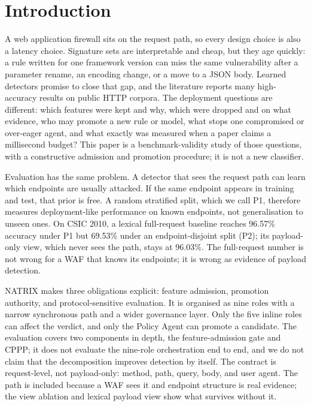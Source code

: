 \documentclass[preprint,11pt]{elsarticle}
\begin{document}
\section{Introduction}\label{introduction}

A web application firewall sits on the request path, so every design
choice is also a latency choice. Signature sets are interpretable and
cheap, but they age quickly: a rule written for one framework version
can miss the same vulnerability after a parameter rename, an encoding
change, or a move to a JSON body. Learned detectors promise to close
that gap, and the literature reports many high-accuracy results on
public HTTP corpora. The deployment questions are different: which
features were kept and why, which were dropped and on what evidence, who
may promote a new rule or model, what stops one compromised or
over-eager agent, and what exactly was measured when a paper claims a
millisecond budget? This paper is a benchmark-validity study of those
questions, with a constructive admission and promotion procedure; it is
not a new classifier.

Evaluation has the same problem. A detector that sees the request path
can learn which endpoints are usually attacked. If the same endpoint
appears in training and test, that prior is free. A random stratified
split, which we call P1, therefore measures deployment-like performance
on known endpoints, not generalisation to unseen ones. On CSIC 2010, a
lexical full-request baseline reaches 96.57\% accuracy under P1 but
69.53\% under an endpoint-disjoint split (P2); its payload-only view,
which never sees the path, stays at 96.03\%. The full-request number is
not wrong for a WAF that knows its endpoints; it is wrong as evidence of
payload detection.

NATRIX makes three obligations explicit: feature admission, promotion
authority, and protocol-sensitive evaluation. It is organised as nine
roles with a narrow synchronous path and a wider governance layer. Only
the five inline roles can affect the verdict, and only the Policy Agent
can promote a candidate. The evaluation covers two components in depth,
the feature-admission gate and CPPP; it does not evaluate the nine-role
orchestration end to end, and we do not claim that the decomposition
improves detection by itself. The contract is request-level, not
payload-only: method, path, query, body, and user agent. The path is
included because a WAF sees it and endpoint structure is real evidence;
the view ablation and lexical payload view show what survives without
it.
\end{document}

